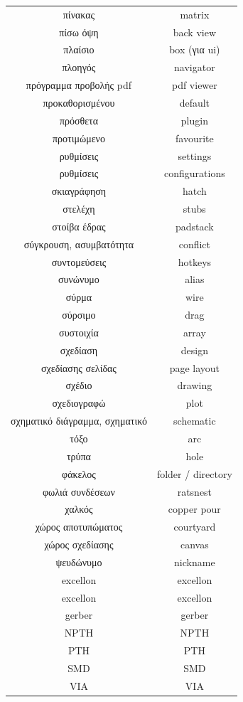 \documentclass[a4paper]{article}
\begin{document}
\begin{longtabu}{ c c }
    πίνακας	&	matrix	\\
    πίσω όψη	&	back view	\\
    πλαίσιο	&	box (για ui)	\\
    πλοηγός	&	navigator	\\
    πρόγραμμα προβολής pdf	&	pdf viewer	\\
    προκαθορισμένου	&	default	\\
    πρόσθετα	&	plugin	\\
    προτιμώμενο	&	favourite	\\
    ρυθμίσεις	&	settings	\\
    ρυθμίσεις	&	configurations	\\
    σκιαγράφηση	&	hatch	\\
    στελέχη	&	stubs	\\
    στοίβα έδρας	&	padstack	\\
    σύγκρουση, ασυμβατότητα	&	conflict	\\
    συντομεύσεις	&	hotkeys	\\
    συνώνυμο	&	alias	\\
    σύρμα	&	wire	\\
    σύρσιμο	&	drag	\\
    συστοιχία	&	array	\\
    σχεδίαση	&	design	\\
    σχεδίασης σελίδας	&	page layout	\\
    σχέδιο	&	drawing	\\
    σχεδιογραφώ	&	plot	\\
    σχηματικό διάγραμμα, σχηματικό	&	schematic	\\
    τόξο	&	arc	\\
    τρύπα	&	hole	\\
    φάκελος	&	folder / directory	\\
    φωλιά συνδέσεων	&	ratsnest	\\
    χαλκός	&	copper pour	\\
    χώρος αποτυπώματος	&	courtyard	\\
    χώρος σχεδίασης	&	canvas	\\
    ψευδώνυμο	&	nickname	\\
    excellon	&	excellon	\\
    excellon	&	excellon	\\
    gerber	&	gerber	\\
    NPTH	&	NPTH	\\
    PTH	&	PTH	\\
    SMD	&	SMD	\\
    VIA	&	VIA	\\
\end{longtabu}
\end{document}
